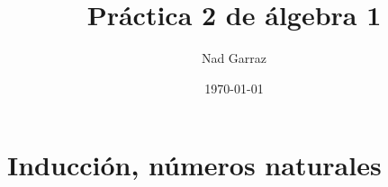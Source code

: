 

\usetikzlibrary{external,angles,quotes}



\def\V{\text{ verdadera }}
\def\eq?{\stackrel{\text{?}}}
\def\eqHI{\stackrel{\text{HI}}}
\def\eqDef{\stackrel{\text{def}}}



\pagestyle{empty} %

\title{Práctica 2 de álgebra 1} %
\author{Nad Garraz} %
\date{\today} %

\section*{Inducción, números naturales}

